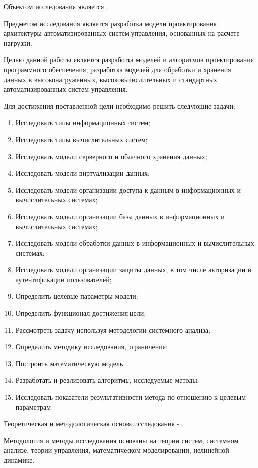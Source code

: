Объектом исследования является .

Предметом исследования является разработка модели проектирования архитектуры  автоматизированных систем управления, основанных на расчете нагрузки.

Целью данной работы является разработка моделей и алгоритмов проектирования программного обеспечения, разработка моделей для обработки и хранения данных в высоконагруженных, высоковычислительных и стандартных  автоматизированных систем управления.

Для достижения поставленной цели необходимо решить следующие задачи:
\begin{enumerate}
\item Исследовать типы информационных систем;
\item Исследовать типы вычислительных систем;
\item Исследовать модели серверного и облачного хранения данных;
\item Исследовать модели виртуализации данных;
\item Исследовать модели организации доступа к данным в информационных и вычислительных системах;
\item Исследовать модели организации базы данных в информационных и вычислительных системах;
\item Исследовать модели обработки данных в информационных и вычислительных системах;
\item Исследовать модели организации защиты данных, в том числе авторизации и аутентификации пользователей;
\item Определить целевые параметры модели;
\item Определить функционал достижения цели;
\item Рассмотреть задачу используя методологии системного анализа;
\item Определить методику исследования, ограничения;
\item Построить математическую модель
\item Разработать и реализовать алгоритмы, исследуемые методы;
\item Исследовать показатели результативности метода по отношению к целевым параметрам
\end{enumerate}

Теоретическая и методологическая основа исследования - .

Методология и методы исследования основаны на теории систем, системном анализе, теории управления, математическом моделировании, нелинейной динамике.


